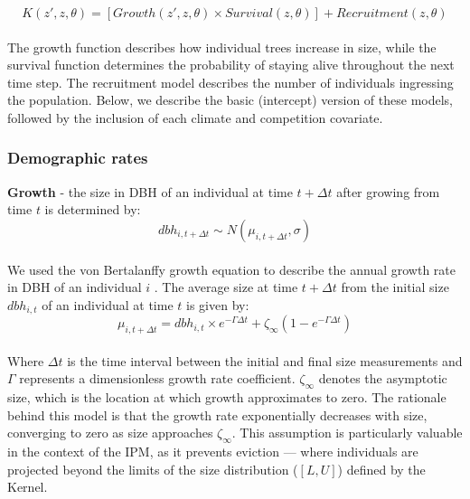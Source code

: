 \begin{equation}
K(z', z, \theta) = [Growth(z', z, \theta) \times Survival(z, \theta)] + Recruitment(z, \theta)
\label{eq:kernel}\end{equation}\\

The growth function describes how individual trees increase in size,
while the survival function determines the probability of staying alive
throughout the next time step. The recruitment model describes the
number of individuals ingressing the population. Below, we describe the
basic (intercept) version of these models, followed by the inclusion of
each climate and competition covariate.\\

\hypertarget{demographic-rates}{%
\subsubsection{Demographic rates}\label{demographic-rates}}

\textbf{Growth} - the size in DBH of an individual at time
\(t + \Delta t\) after growing from time \(t\) is determined by:\\

\begin{equation}
  dbh_{i,t + \Delta t} \sim N(\mu_{i, t+\Delta t}, \sigma)
\label{eq:VBlik}\end{equation}\\

We used the von Bertalanffy growth equation to describe the annual
growth rate in DBH of an individual \(i\) \citep{von1957quantitative}.
The average size at time \(t+\Delta t\) from the initial size
\(dbh_{i, t}\) of an individual at time \(t\) is given by:\\

\begin{equation}
  \mu_{i, t+\Delta t} = dbh_{i,t}  \times e^{-\Gamma \Delta t} + \zeta_{\infty} (1- e^{-\Gamma \Delta t})
\label{eq:VBmodel}\end{equation}\\

Where \(\Delta t\) is the time interval between the initial and final
size measurements and \(\Gamma\) represents a dimensionless growth rate
coefficient. \(\zeta_{\infty}\) denotes the asymptotic size, which is
the location at which growth approximates to zero. The rationale behind
this model is that the growth rate exponentially decreases with size,
converging to zero as size approaches \(\zeta_{\infty}\). This
assumption is particularly valuable in the context of the IPM, as it
prevents eviction --- where individuals are projected beyond the limits
of the size distribution (\([L, U]\)) defined by the Kernel.\\


